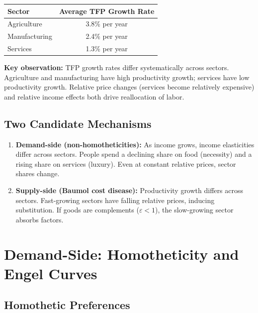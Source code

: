 \documentclass[a4paper,11pt]{article}
\begin{document}
\begin{center}
\begin{tabular}{lc}
\toprule
\textbf{Sector} & \textbf{Average TFP Growth Rate} \\
\midrule
Agriculture & 3.8\% per year \\
Manufacturing & 2.4\% per year \\
Services & 1.3\% per year \\
\bottomrule
\end{tabular}
\end{center}

\begin{resultbox}
\textbf{Key observation:} TFP growth rates differ systematically across sectors. Agriculture and manufacturing have high productivity growth; services have low productivity growth. Relative price changes (services become relatively expensive) and relative income effects both drive reallocation of labor.
\end{resultbox}

\subsection*{Two Candidate Mechanisms}

\begin{enumerate}
    \item \textbf{Demand-side (non-homotheticities):} As income grows, income elasticities differ across sectors. People spend a declining share on food (necessity) and a rising share on services (luxury). Even at constant relative prices, sector shares change.
    \item \textbf{Supply-side (Baumol cost disease):} Productivity growth differs across sectors. Fast-growing sectors have falling relative prices, inducing substitution. If goods are complements ($\varepsilon < 1$), the slow-growing sector absorbs factors.
\end{enumerate}

\clearpage

\section{Demand-Side: Homotheticity and Engel Curves}

\subsection*{Homothetic Preferences}
\end{document}
